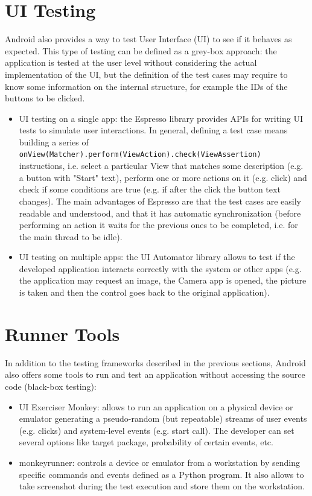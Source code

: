 \documentclass[11pt,a4paper,notitlepage]{article}
\begin{document}
\section{UI Testing}
Android also provides a way to test User Interface (UI) to see if it behaves as expected. This type of testing can be defined as a grey-box approach: the application is tested at the user level without considering the actual implementation of the UI, but the definition of the test cases may require to know some information on the internal structure, for example the IDs of the buttons to be clicked.
\begin{itemize}
	\item UI testing on a single app: the Espresso library provides APIs for writing UI tests to simulate user interactions. In general, defining a test case means building a series of \texttt{onView(Matcher).perform(ViewAction).check(ViewAssertion)} instructions, i.e. select a particular View that matches some description (e.g. a button with "Start" text), perform one or more actions on it (e.g. click) and check if some conditions are true (e.g. if after the click the button text changes). The main advantages of Espresso are that the test cases are easily readable and understood, and that it has automatic synchronization (before performing an action it waits for the previous ones to be completed, i.e. for the main thread to be idle).
	\item UI testing on multiple apps: the UI Automator library allows to test if the developed application interacts correctly with the system or other apps (e.g. the application may request an image, the Camera app is opened, the picture is taken and then the control goes back to the original application). 
\end{itemize}

\section{Runner Tools}
In addition to the testing frameworks described in the previous sections, Android also offers some tools to run and test an application without accessing the source code (black-box testing):
\begin{itemize}
	\item UI Exerciser Monkey: allows to run an application on a physical device or emulator generating a pseudo-random (but repeatable) streams of user events (e.g. clicks) and system-level events (e.g. start call). The developer can set several options like target package, probability of certain events, etc.
	\item monkeyrunner: controls a device or emulator from a workstation by sending specific commands and events defined as a Python program. It also allows to take screenshot during the test execution and store them on the workstation.
\end{itemize}
\end{document}
